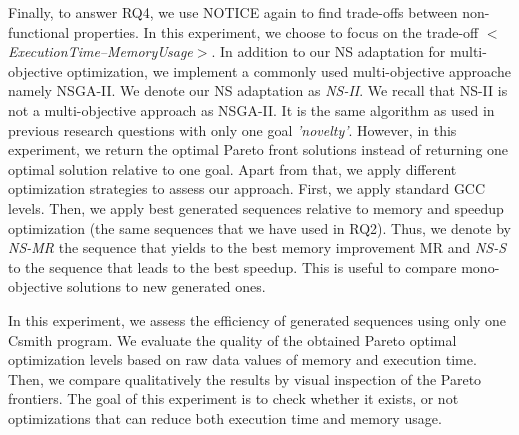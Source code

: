 Finally, to answer RQ4, we use NOTICE again to find trade-offs between non-functional properties. In this experiment, we choose to focus on the trade-off \textit{$<$ExecutionTime--MemoryUsage$>$}. In addition to our NS adaptation for multi-objective optimization, we implement a commonly used multi-objective approache namely NSGA-II\cite{deb2002fast}. We denote our NS adaptation as \textit{NS-II}. We recall that NS-II is not a multi-objective approach as NSGA-II. It is the same algorithm as used in previous research questions with only one goal \textit{'novelty'}. However, in this experiment, we return the optimal Pareto front solutions instead of returning one optimal solution relative to one goal. 
Apart from that, we apply different optimization strategies to assess our approach. First, we apply standard GCC levels. Then, we apply best generated sequences relative to memory and speedup optimization (the same sequences that we have used in RQ2). Thus, we denote by \textit{NS-MR} the sequence that yields to the best memory improvement MR and \textit{NS-S} to the sequence that leads to the best speedup. This is useful to compare mono-objective solutions to new generated ones.

In this experiment, we assess the efficiency of generated sequences using only one Csmith program.
We evaluate the quality of the obtained Pareto optimal optimization levels based on raw data values of memory and execution time. Then, we compare qualitatively the results by visual inspection of the Pareto frontiers.
The goal of this experiment is to check whether it exists, or not optimizations that can reduce both execution time and memory usage.




